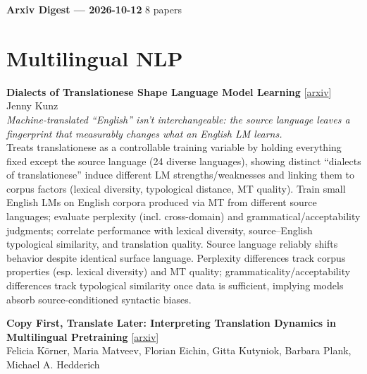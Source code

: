 \documentclass[12pt,letterpaper]{article}
\begin{document}
{\footnotesize\textbf{Arxiv Digest --- 2026-10-12} \hfill 8 papers}

\smallskip

\section*{Multilingual NLP}

{\small\textbf{Dialects of Translationese Shape Language Model Learning}} {\scriptsize[\href{https://arxiv.org/abs/2602.16469}{arxiv}]}\\
{\scriptsize Jenny Kunz}\\

{\small\textit{Machine-translated ``English'' isn't interchangeable: the source language leaves a fingerprint that measurably changes what an English LM learns.}}\\[1pt]
{\footnotesize Treats translationese as a controllable training variable by holding everything fixed except the source language (24 diverse languages), showing distinct ``dialects of translationese'' induce different LM strengths/weaknesses and linking them to corpus factors (lexical diversity, typological distance, MT quality). Train small English LMs on English corpora produced via MT from different source languages; evaluate perplexity (incl. cross-domain) and grammatical/acceptability judgments; correlate performance with lexical diversity, source--English typological similarity, and translation quality. Source language reliably shifts behavior despite identical surface language. Perplexity differences track corpus properties (esp. lexical diversity) and MT quality; grammaticality/acceptability differences track typological similarity once data is sufficient, implying models absorb source-conditioned syntactic biases.}

\medskip

{\small\textbf{Copy First, Translate Later: Interpreting Translation Dynamics in Multilingual Pretraining}} {\scriptsize[\href{https://arxiv.org/abs/2604.17633}{arxiv}]}\\
{\scriptsize Felicia K\"orner, Maria Matveev, Florian Eichin, Gitta Kutyniok, Barbara Plank, Michael A. Hedderich}\\
\end{document}
